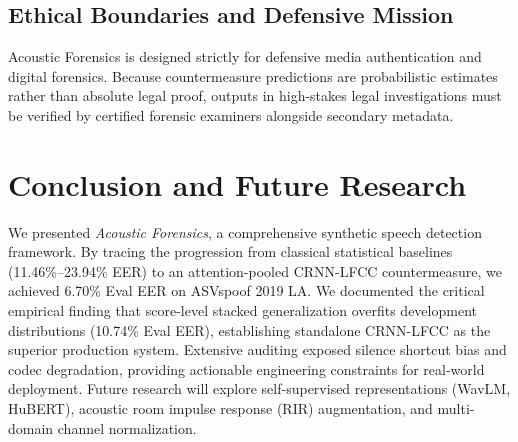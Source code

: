 \documentclass[conference]{IEEEtran}
\begin{document}
\subsection{Ethical Boundaries and Defensive Mission}
Acoustic Forensics is designed strictly for defensive media authentication and digital forensics. Because countermeasure predictions are probabilistic estimates rather than absolute legal proof, outputs in high-stakes legal investigations must be verified by certified forensic examiners alongside secondary metadata.

\section{Conclusion and Future Research}
We presented \textit{Acoustic Forensics}, a comprehensive synthetic speech detection framework. By tracing the progression from classical statistical baselines (11.46\%--23.94\% EER) to an attention-pooled CRNN-LFCC countermeasure, we achieved 6.70\% Eval EER on ASVspoof 2019 LA. We documented the critical empirical finding that score-level stacked generalization overfits development distributions (10.74\% Eval EER), establishing standalone CRNN-LFCC as the superior production system. Extensive auditing exposed silence shortcut bias and codec degradation, providing actionable engineering constraints for real-world deployment. Future research will explore self-supervised representations (WavLM, HuBERT), acoustic room impulse response (RIR) augmentation, and multi-domain channel normalization.
\end{document}
